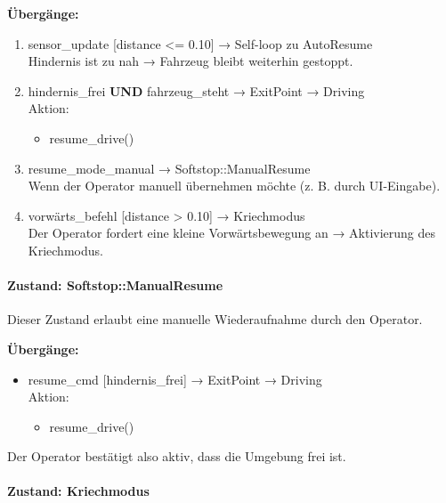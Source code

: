 \textbf{Übergänge:}
\begin{enumerate}
    \item sensor\_update [distance <= 0.10] → Self-loop zu AutoResume\\
    Hindernis ist zu nah → Fahrzeug bleibt weiterhin gestoppt.

    \item hindernis\_frei \textbf{UND} fahrzeug\_steht → ExitPoint → Driving\\
    Aktion:
    \begin{itemize}
        \item resume\_drive()
    \end{itemize}

    \item resume\_mode\_manual → Softstop::ManualResume\\
    Wenn der Operator manuell übernehmen möchte (z. B. durch UI-Eingabe).

    \item vorwärts\_befehl [distance > 0.10] → Kriechmodus\\
    Der Operator fordert eine kleine Vorwärtsbewegung an → Aktivierung des Kriechmodus.
\end{enumerate}

\paragraph{Zustand: Softstop::ManualResume}

Dieser Zustand erlaubt eine manuelle Wiederaufnahme durch den Operator.

\textbf{Übergänge:}
\begin{itemize}
    \item resume\_cmd [hindernis\_frei] → ExitPoint → Driving\\
    Aktion:
    \begin{itemize}
        \item resume\_drive()
    \end{itemize}
\end{itemize}

Der Operator bestätigt also aktiv, dass die Umgebung frei ist.

\paragraph{Zustand: Kriechmodus}

